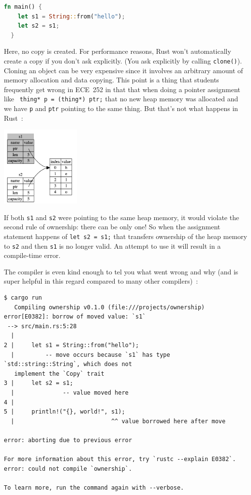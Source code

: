 \documentclass[a4paper]{report}
\begin{document}
\begin{lstlisting}[language=Rust]
  fn main() {
    let s1 = String::from("hello");
    let s2 = s1;
  }
\end{lstlisting}

Here, no copy is created. For performance reasons, Rust won't automatically create a copy if you don't ask explicitly. (You ask explicitly by calling \texttt{clone()}). Cloning an object can be very expensive since it involves an arbitrary amount of memory allocation and data copying. This point is a thing that students frequently get wrong in ECE~252 in that that when doing a pointer assignment like \texttt{ thing* p = (thing*) ptr;} that no new heap memory was allocated and we have \texttt{p} and \texttt{ptr} pointing to the same thing. But that's not what happens in Rust~\cite{rustdocs}:

\begin{center}
\includegraphics[width=0.3\textwidth]{images/string-rust.png}
\end{center}

If both \texttt{s1} and \texttt{s2} were pointing to the same heap memory, it would violate the second rule of ownership: there can be only one! So when the assignment statement happens of \texttt{let s2 = s1;} that transfers ownership of the heap memory to \texttt{s2} and then \texttt{s1} is no longer valid. An attempt to use it will result in a compile-time error. 


The compiler is even kind enough to tel you what went wrong and why (and is super helpful in this regard compared to many other compilers)~\cite{rustdocs}:
\begin{verbatim}
$ cargo run
   Compiling ownership v0.1.0 (file:///projects/ownership)
error[E0382]: borrow of moved value: `s1`
 --> src/main.rs:5:28
  |
2 |     let s1 = String::from("hello");
  |         -- move occurs because `s1` has type `std::string::String`, which does not
   implement the `Copy` trait
3 |     let s2 = s1;
  |              -- value moved here
4 | 
5 |     println!("{}, world!", s1);
  |                            ^^ value borrowed here after move

error: aborting due to previous error

For more information about this error, try `rustc --explain E0382`.
error: could not compile `ownership`.

To learn more, run the command again with --verbose.
\end{verbatim}
\end{document}
